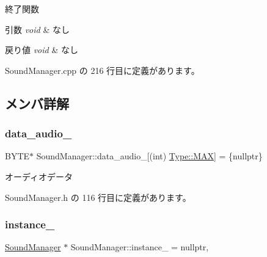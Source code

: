 終了関数 


\begin{DoxyParams}{引数}
{\em void} & なし \\
\hline
\end{DoxyParams}

\begin{DoxyRetVals}{戻り値}
{\em void} & なし \\
\hline
\end{DoxyRetVals}


 Sound\+Manager.\+cpp の 216 行目に定義があります。



\subsection{メンバ詳解}
\mbox{\label{class_sound_manager_ab519873998a45c15e8cf74881d3ee6ca}} 
\subsubsection{\texorpdfstring{data\+\_\+audio\+\_\+}{data\_audio\_}}
{\footnotesize\ttfamily B\+Y\+TE$\ast$ Sound\+Manager\+::data\+\_\+audio\+\_\+\mbox{[}(int) \mbox{\hyperlink{class_sound_manager_a0b81fc2281f062cd6489ab281fc3be1da26a4b44a837bf97b972628509912b4a5}{Type\+::\+M\+AX}}\mbox{]} = \{nullptr\}\hspace{0.3cm}{\ttfamily [private]}}



オーディオデータ 



 Sound\+Manager.\+h の 116 行目に定義があります。

\mbox{\label{class_sound_manager_a9b056c7a340bb57b317533d34f679743}} 
\subsubsection{\texorpdfstring{instance\+\_\+}{instance\_}}
{\footnotesize\ttfamily \mbox{\hyperlink{class_sound_manager}{Sound\+Manager}} $\ast$ Sound\+Manager\+::instance\+\_\+ = nullptr\hspace{0.3cm}{\ttfamily [static]}, {\ttfamily [private]}}



